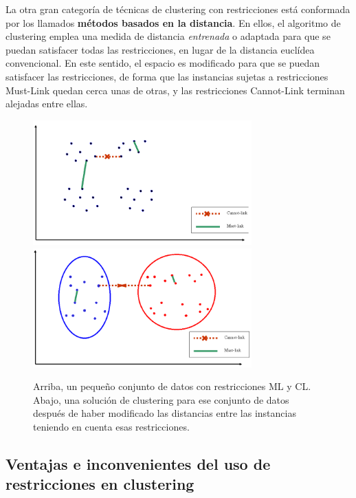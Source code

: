 La otra gran categoría de técnicas de clustering con restricciones está conformada por los llamados \textbf{métodos basados en la distancia}. En ellos, el algoritmo de clustering emplea una medida de distancia \emph{entrenada} o adaptada para que se puedan satisfacer todas las restricciones, en lugar de la distancia euclídea convencional. En este sentido, el espacio es modificado para que se puedan satisfacer las restricciones, de forma que las instancias sujetas a restricciones Must-Link quedan cerca unas de otras, y las restricciones Cannot-Link terminan alejadas entre ellas.

\begin{figure}
	\centering
	\includegraphics[width=0.75\textwidth]{Images/const_clust}
	\includegraphics[width=0.75\textwidth]{Images/const_clust_dist}
	\caption[Arriba, un pequeño conjunto de datos con restricciones ML y CL. Abajo, una solución de clustering para ese conjunto de datos después de haber modificado las distancias entre las instancias teniendo en cuenta esas restricciones.]{Arriba, un pequeño conjunto de datos con restricciones ML y CL. Abajo, una solución de clustering para ese conjunto de datos después de haber modificado las distancias entre las instancias teniendo en cuenta esas restricciones. \cite{davidson2007survey}}
	\label{fig:const_clust_dist}
\end{figure}


\subsection{Ventajas e inconvenientes del uso de restricciones en clustering}


